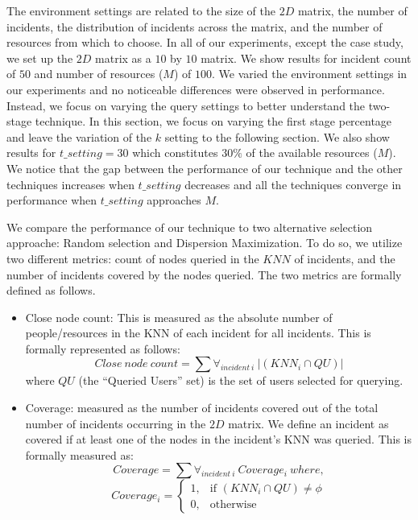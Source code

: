 \documentclass{acm_proc_article-sp}
\begin{document}
The environment settings are related to the size of the $2D$ matrix, the number of incidents, the distribution of incidents across the matrix, and the number of resources from which to choose. In all of our experiments, except the case study, we set up the $2D$ matrix as a $10$ by $10$ matrix. We show results for incident count of $50$ and number of resources ($M$) of $100$. We varied the environment settings in our experiments and no noticeable differences were observed in performance. Instead, we focus on varying the query settings to better understand the two-stage technique. In this section, we focus on varying the first stage percentage and leave the variation of the $k$ setting to the following section. We also show results for $t\_setting = 30$ which constitutes $30\%$ of the available resources ($M$). We notice that the gap between the performance of our technique and the other techniques increases when $t\_setting$ decreases and all the techniques converge in performance when $t\_setting$ approaches $M$. \par
We compare the performance of our technique to two alternative selection approache: Random selection and Dispersion Maximization. To do so, we utilize two different metrics: count of nodes queried in the $KNN$ of incidents, and the number of incidents covered by the nodes queried. The two metrics are formally defined as follows.
\begin{itemize}
\item Close node count: This is measured as the absolute number of people/resources in the KNN of each incident for all incidents. This is formally represented as follows:
\begin{equation}
Close\ node\ count = \sum \forall_{incident\ i}\ |(KNN_i \cap {QU})|
\end{equation}
where $QU$ (the ``Queried Users'' set) is the set of users selected for querying.
\item Coverage: measured as the number of incidents covered out of the total number of incidents occurring in the $2D$ matrix. We define an incident as covered if at least one of the nodes in the incident's KNN was queried. This is formally measured as:
\begin{equation}
Coverage = \sum \forall_{incident\ i}\ Coverage_i\  where,
\end{equation}
\[
  Coverage_i =
\begin{cases}
  1,& \text{if }(KNN_i \cap {QU}) \neq \phi\\
  0,              & \text{otherwise}
\end{cases}
\]
\end{itemize}
\end{document}
